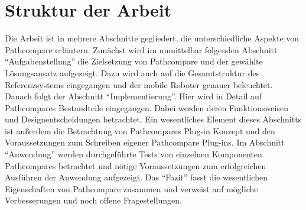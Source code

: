 \section{Struktur der Arbeit}
Die Arbeit ist in mehrere Abschnitte gegliedert, die unterschiedliche Aspekte
von Pathcompare erläutern. Zunächst wird im unmittelbar folgenden Abschnitt
``Aufgabenstellung'' die Zielsetzung von Pathcompare und der gewählte
Lösungsansatz aufgezeigt. Dazu wird auch auf die Gesamtstruktur des
Referenzsystems eingegangen und der mobile Roboter genauer beleuchtet.  Danach
folgt der Abschnitt ``Implementierung''. Hier wird in Detail auf Pathcompares
Bestandteile eingegangen. Dabei werden deren Funktionsweisen und
Designentscheidungen betrachtet. Ein wesentliches Element dieses Abschnitts ist
außerdem die Betrachtung von Pathcompares Plug-in Konzept und den
Voraussetzungen zum Schreiben eigener Pathcompare Plug-ins. Im Abschnitt
``Anwendung'' werden durchgeführte Tests von einzelnen Komponenten Pathcompares
betrachtet und nötige Voraussetzungen zum erfolgreichen Ausführen der Anwendung
aufgezeigt. Das ``Fazit'' fasst die wesentlichen Eigenschaften von Pathcompare
zusammen und verweist auf mögliche Verbesserungen und noch offene
Fragestellungen.


